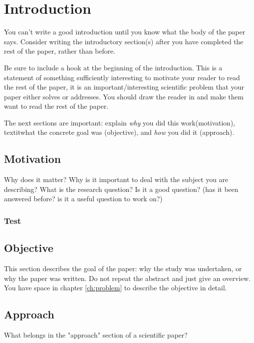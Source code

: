 \chapter{Introduction}
\label{ch:introduction}

You can't write a good introduction until you know what the body of the paper
says. Consider writing the introductory section(s) after you have completed the
rest of the paper, rather than before.

Be sure to include a hook at the beginning of the introduction. This is a
statement of something sufficiently interesting to motivate your reader to read
the rest of the paper, it is an important/interesting scientific problem that
your paper either solves or addresses. You should draw the reader in and make
them want to read the rest of the paper.

The next sections are important: explain \textit{why} you did this
work(motivation), textit{what} the concrete goal was (objective), and
\textit{how} you did it (approach).

\section{Motivation}
\label{sec:Motivation}

Why does it matter? Why is it important to deal with the subject you are
describing? What is the research question? Is it a good question? (has it been
answered before? is it a useful question to work on?)

\subsection{Test}

\section{Objective}
\label{sec:Objective}

This section describes the goal of the paper: why the study was undertaken, or
why the paper was written. Do not repeat the abstract and just give an overview.
You have space in chapter \ref{ch:problem} to describe the objective in
detail.

\section{Approach}
\label{sec:Approach}

What belongs in the "approach" section of a scientific paper?

